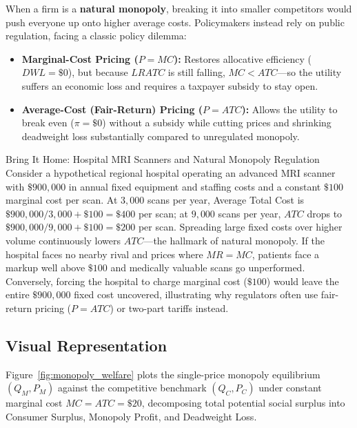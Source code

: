 \documentclass[11pt,letterpaper]{article}
\begin{document}
When a firm is a \textbf{natural monopoly}, breaking it into smaller competitors would push everyone up onto higher average costs. Policymakers instead rely on public regulation, facing a classic policy dilemma:
\begin{itemize}
    \item \textbf{Marginal-Cost Pricing ($P = MC$):} Restores allocative efficiency ($DWL = \$0$), but because $LRATC$ is still falling, $MC < ATC$---so the utility suffers an economic loss and requires a taxpayer subsidy to stay open.
    \item \textbf{Average-Cost (Fair-Return) Pricing ($P = ATC$):} Allows the utility to break even ($\pi = \$0$) without a subsidy while cutting prices and shrinking deadweight loss substantially compared to unregulated monopoly.
\end{itemize}

\begin{examplecase}{Bring It Home: Hospital MRI Scanners and Natural Monopoly Regulation}
Consider a hypothetical regional hospital operating an advanced MRI scanner with $\$900{,}000$ in annual fixed equipment and staffing costs and a constant $\$100$ marginal cost per scan. At $3{,}000$ scans per year, Average Total Cost is $\$900{,}000 / 3{,}000 + \$100 = \$400$ per scan; at $9{,}000$ scans per year, $ATC$ drops to $\$900{,}000 / 9{,}000 + \$100 = \$200$ per scan. Spreading large fixed costs over higher volume continuously lowers $ATC$---the hallmark of natural monopoly. If the hospital faces no nearby rival and prices where $MR = MC$, patients face a markup well above $\$100$ and medically valuable scans go unperformed. Conversely, forcing the hospital to charge marginal cost ($\$100$) would leave the entire $\$900{,}000$ fixed cost uncovered, illustrating why regulators often use fair-return pricing ($P = ATC$) or two-part tariffs instead.
\end{examplecase}

\subsection*{Visual Representation}
Figure~\ref{fig:monopoly_welfare} plots the single-price monopoly equilibrium $(Q_M, P_M)$ against the competitive benchmark $(Q_C, P_C)$ under constant marginal cost $MC = ATC = \$20$, decomposing total potential social surplus into Consumer Surplus, Monopoly Profit, and Deadweight Loss.
\end{document}
